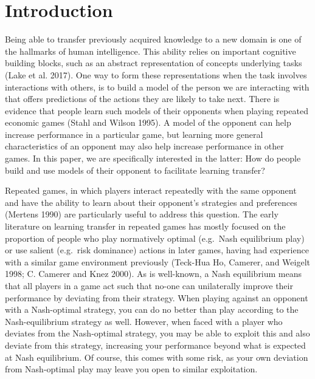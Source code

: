 \documentclass[smallextended]{svjour3}       %
\begin{document}
\def\spacingset#1{\renewcommand{\baselinestretch}%
{#1}\small\normalsize} \spacingset{1}


\hypertarget{introduction}{%
\section{Introduction}\label{introduction}}

Being able to transfer previously acquired knowledge to a new domain is
one of the hallmarks of human intelligence. This ability relies on
important cognitive building blocks, such as an abstract representation
of concepts underlying tasks (Lake et al. 2017). One way to form these
representations when the task involves interactions with others, is to
build a model of the person we are interacting with that offers
predictions of the actions they are likely to take next. There is
evidence that people learn such models of their opponents when playing
repeated economic games (Stahl and Wilson 1995). A model of the opponent
can help increase performance in a particular game, but learning more
general characteristics of an opponent may also help increase
performance in other games. In this paper, we are specifically
interested in the latter: How do people build and use models of their
opponent to facilitate learning transfer?

Repeated games, in which players interact repeatedly with the same
opponent and have the ability to learn about their opponent's strategies
and preferences (Mertens 1990) are particularly useful to address this
question. The early literature on learning transfer in repeated games
has mostly focused on the proportion of people who play normatively
optimal (e.g.~Nash equilibrium play) or use salient (e.g.~risk
dominance) actions in later games, having had experience with a similar
game environment previously (Teck-Hua Ho, Camerer, and Weigelt 1998; C.
Camerer and Knez 2000). As is well-known, a Nash equilibrium means that
all players in a game act such that no-one can unilaterally improve
their performance by deviating from their strategy. When playing against
an opponent with a Nash-optimal strategy, you can do no better than play
according to the Nash-equilibrium strategy as well. However, when faced
with a player who deviates from the Nash-optimal strategy, you may be
able to exploit this and also deviate from this strategy, increasing
your performance beyond what is expected at Nash equilibrium. Of course,
this comes with some risk, as your own deviation from Nash-optimal play
may leave you open to similar exploitation.
\end{document}

